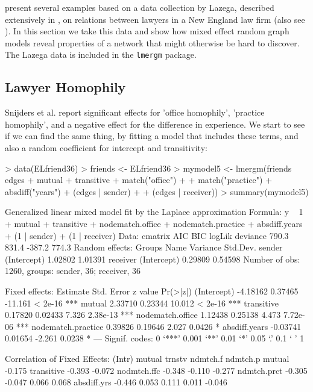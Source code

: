 \documentclass[a4paper]{article}
\begin{document}
\cite{snijders2006new} present several examples based on a data collection by Lazega,
described extensively in \cite{lazega2001collegial}, on relations between lawyers in a New England law firm (also see \cite{lazega1999multiplexity}).
In this section we take this data and show how mixed effect random graph models reveal properties of a network that might otherwise be hard to discover.
The Lazega data is included in the \texttt{lmergm} package.

\subsection{Lawyer Homophily}

Snijders et al. report significant effects for 'office homophily', 'practice homophily', and a negative effect for the difference in experience.
We start to see if we can find the same thing, by fitting a model that includes these terms, and also a random coefficient for intercept and transitivity:

\begin{Schunk}
\begin{Sinput}
> data(ELfriend36)
> friends <- ELfriend36
> mymodel5 <- lmergm(friends ~ edges + mutual + transitive + match("office") + 
+     match("practice") + absdiff("years") + (edges | sender) + 
+     (edges | receiver))
> summary(mymodel5)
\end{Sinput}
\begin{Soutput}
Generalized linear mixed model fit by the Laplace approximation 
Formula: y ~ 1 + mutual + transitive + nodematch.office + nodematch.practice +      absdiff.years + (1 | sender) + (1 | receiver) 
   Data: cmatrix 
   AIC   BIC logLik deviance
 790.3 831.4 -387.2    774.3
Random effects:
 Groups   Name        Variance Std.Dev.
 sender   (Intercept) 1.02802  1.01391 
 receiver (Intercept) 0.29809  0.54598 
Number of obs: 1260, groups: sender, 36; receiver, 36

Fixed effects:
                   Estimate Std. Error z value Pr(>|z|)    
(Intercept)        -4.18162    0.37465 -11.161  < 2e-16 ***
mutual              2.33710    0.23344  10.012  < 2e-16 ***
transitive          0.17820    0.02433   7.326 2.38e-13 ***
nodematch.office    1.12438    0.25138   4.473 7.72e-06 ***
nodematch.practice  0.39826    0.19646   2.027   0.0426 *  
absdiff.years      -0.03741    0.01654  -2.261   0.0238 *  
---
Signif. codes:  0 ‘***’ 0.001 ‘**’ 0.01 ‘*’ 0.05 ‘.’ 0.1 ‘ ’ 1 

Correlation of Fixed Effects:
            (Intr) mutual trnstv ndmtch.f ndmtch.p
mutual      -0.175                                
transitive  -0.393 -0.072                         
nodmtch.ffc -0.348 -0.110 -0.277                  
ndmtch.prct -0.305 -0.047  0.066  0.068           
absdiff.yrs -0.446  0.053  0.111  0.011   -0.046  
\end{Soutput}
\end{Schunk}
\end{document}
